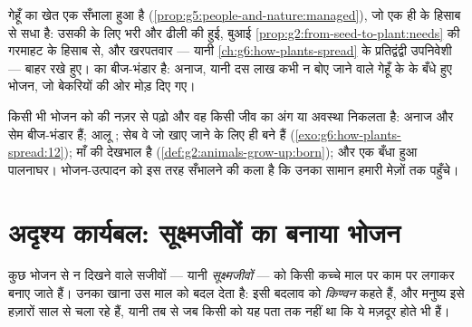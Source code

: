 \begin{example}[गेहूँ का खेत होता क्या है]\label{ex:g6:producing-our-food:wheat}
गेहूँ का खेत एक सँभाला हुआ  है
(\cref{prop:g5:people-and-nature:managed}), जो एक ही  के हिसाब
से सधा है: उसकी  के लिए  भरी और ढीली की हुई, बुआई
\cref{prop:g2:from-seed-to-plant:needs} की गरमाहट के हिसाब से, और
खरपतवार --- यानी \cref{ch:g6:how-plants-spread} के प्रतिद्वंद्वी
उपनिवेशी --- बाहर रखे हुए।   का बीज-भंडार है: अनाज, यानी
दस लाख कभी न बोए जाने वाले गेहूँ के  के बँधे हुए भोजन, जो
बेकरियों की ओर मोड़ दिए गए।
\end{example}

\begin{remark}[हर भोजन जीवन-चक्र की कोई अवस्था है]\label{rem:g6:producing-our-food:stage}
किसी भी भोजन को  की नज़र से पढ़ो और वह किसी जीव का अंग या
अवस्था निकलता है: अनाज और सेम बीज-भंडार हैं; आलू ; सेब वे  जो खाए
जाने के लिए ही बने हैं (\cref{exo:g6:how-plants-spread:12}); 
 माँ की देखभाल है (\cref{def:g2:animals-grow-up:born}); और 
एक बँधा हुआ पालनाघर। भोजन-उत्पादन  को इस तरह सँभालने की कला
है कि उनका सामान हमारी मेज़ों तक पहुँचे।
\end{remark}

\section{अदृश्य कार्यबल: सूक्ष्मजीवों का बनाया भोजन}

\begin{definition}[किण्वन]\label{def:g6:producing-our-food:fermentation}
कुछ भोजन  से न दिखने वाले सजीवों --- यानी
\emph{सूक्ष्मजीवों} --- को किसी कच्चे माल
पर काम पर लगाकर बनाए जाते हैं। उनका खाना उस माल को बदल देता है: इसी
बदलाव को \emph{किण्वन} कहते हैं, और मनुष्य इसे हज़ारों
साल से चला रहे हैं, यानी तब से जब किसी को यह पता तक नहीं था कि ये
मज़दूर होते भी हैं।
\end{definition}

